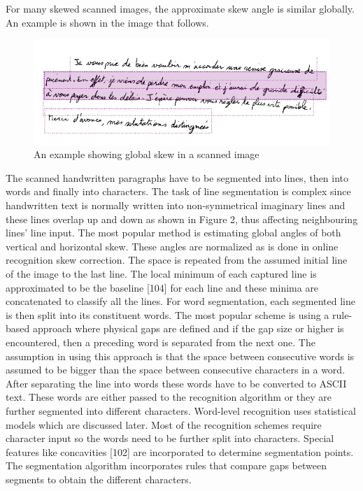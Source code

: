 For many skewed scanned images, the approximate skew angle is similar globally. An example is shown in the image that follows.\\
\newpage
\begin{figure}[h]
	\centering
	\includegraphics[scale=0.9]{1}
	\caption{An example showing global skew in a scanned image}
\end{figure}
\nocite{Haykin:Communication_Systems}
The scanned handwritten paragraphs have to be segmented into lines, then into words and finally into characters. The task of line segmentation is complex since handwritten text is normally written into non-symmetrical imaginary lines and these lines overlap up and down as shown in Figure 2, thus affecting neighbouring lines’ line input. The most popular method is estimating global angles of both vertical and horizontal skew. These angles are normalized as is done in online recognition skew correction. The space is repeated from the assumed initial line of the image to the last line. The local minimum of each captured line is approximated to be the baseline [104] for each line and these minima are concatenated to classify all the lines. For word segmentation, each segmented line is then split into its constituent words. The most popular scheme is using a rule-based approach where physical gaps are defined and if the gap size or higher is encountered, then a preceding word is separated from the next one. The assumption in using this approach is that the space between consecutive words is assumed to be bigger than the space between consecutive characters in a word. After separating the line into words these words have to be converted to ASCII text. These words are either passed to the recognition algorithm or they are further segmented into different characters. Word-level recognition uses statistical models which are discussed later. Most of the recognition schemes require character input so the words need to be further split into characters. Special features like concavities [102] are incorporated to determine segmentation points. The segmentation algorithm incorporates rules that compare gaps between segments to obtain the different characters.

